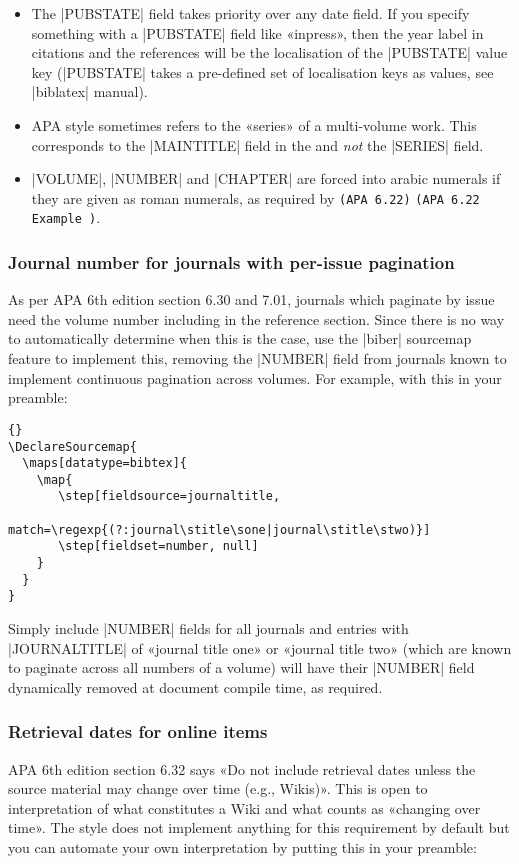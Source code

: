 \documentclass{ltxdockit}
\newcommand\apa[2][]{\ifthenelse{\equal{#1}{}}%
                       {\texttt{(APA #2)}}%
                       {\texttt{(APA #2 Example #1)}}}
\begin{document}
\begin{itemize}
\setlength{\itemsep}{0pt}
\item The |PUBSTATE| field takes priority over any date field. If you specify
  something with a |PUBSTATE| field like «inpress», then the year label in
  citations and the references will be the localisation of the |PUBSTATE|
  value key (|PUBSTATE| takes a pre-defined set of localisation keys as
  values, see |biblatex| manual).
\item APA style sometimes refers to the «series» of a multi-volume work.
  This corresponds to the |MAINTITLE| field in the  and
  \emph{not} the |SERIES| field.
\item |VOLUME|, |NUMBER| and |CHAPTER| are forced into arabic numerals if
  they are given as roman numerals, as required by \apa{6.22}.
\end{itemize}

\subsubsection{Journal number for journals with per-issue pagination}
As per APA 6th edition section 6.30 and 7.01, journals which paginate by
issue need the volume number including in the reference section. Since
there is no way to automatically determine when this is the case, use the
|biber| sourcemap feature to implement this, removing the |NUMBER| field
from journals known to implement continuous pagination across volumes. For
example, with this in your preamble:

\begin{lstlisting}[style=latex]{}
\DeclareSourcemap{
  \maps[datatype=bibtex]{
    \map{
       \step[fieldsource=journaltitle,
             match=\regexp{(?:journal\stitle\sone|journal\stitle\stwo)}]
       \step[fieldset=number, null]
    }
  }
}
\end{lstlisting}
%
Simply include |NUMBER| fields for all journals and entries with
|JOURNALTITLE| of «journal title one» or «journal title two» (which
are known to paginate across all numbers of a volume) will have
their |NUMBER| field dynamically removed at document compile time, as
required.

\subsubsection{Retrieval dates for online items}

APA 6th edition section 6.32 says «Do not include retrieval dates unless
the source material may change over time (e.g., Wikis)». This is open to
interpretation of what constitutes a Wiki and what counts as «changing over
time». The style does not implement anything for this requirement by
default but you can automate your own interpretation by putting this in
your preamble:
\end{document}

